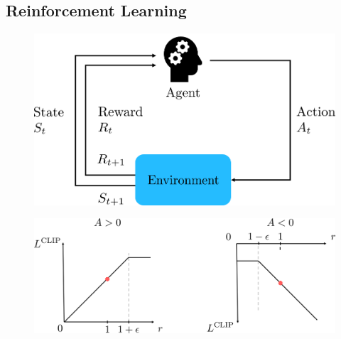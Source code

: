 \subsection{Reinforcement Learning}
\label{sec::323_rl}
\cite{mnih2015human} %
\cite{schulman2015trust} %
\cite{schulman2015high} %
\cite{schulman2017proximal} %


\begin{figure}[h]
	\centering
	\includegraphics[scale=.5]{chapters/03_background/img/reinforcement_learning.png}
	\label{fig::323_rl}
\end{figure}
\begin{figure}[h]
	\centering
	\includegraphics[scale=.35]{chapters/03_background/img/ppo_objective.png}
	\label{fig::323_ppo}
\end{figure}